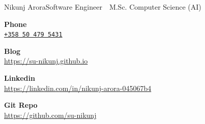 \documentclass{article}
\begin{document}
\begin{cv}[avatar]{Nikunj Arora}{Software Engineer \,\textbullet\, M.Sc. Computer Science (AI)}
\cvseparator[2]
\begin{cvitem}[Phone][4]
    \textbf{Phone}\\
    \href{tel:+358504795431}{\texttt{+358 50 479 5431}}
\end{cvitem}

\cvseparator[2]
\begin{cvitem}[Globe][4]
    \textbf{Blog}\\
    \href{https://su-nikunj.github.io}{\url{https://su-nikunj.github.io}}
\end{cvitem}

\cvseparator[2]
\begin{cvitem}[Linkedin][4]
    \textbf{Linkedin}\\
    \href{https://linkedin.com/in/nikunj-arora-045067b4}{\url{https://linkedin.com/in/nikunj-arora-045067b4}}
\end{cvitem}

\cvseparator[2]
\begin{cvitem}[CodeFork][4]
    \textbf{Git Repo}\\
    \href{https://github.com/su-nikunj}{\url{https://github.com/su-nikunj}}
\end{cvitem}



\begin{cvitem}[Flask][3]
    \par
    \par
\end{cvitem}

\cvseparator[2]
\begin{cvitem}[Code][3]
    \par
    \par
\end{cvitem}

\cvseparator[2]
\begin{cvitem}[Wrench][3]
    \par
    \par
\end{cvitem}



\end{cv}
\end{document}
